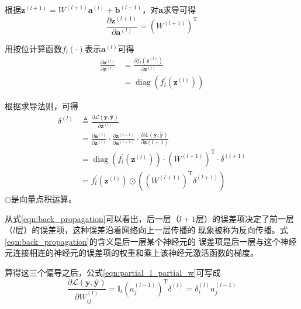 根据$\mathbf{z}^{(l+1)}=W^{(l+1)} \mathbf{a}^{(l)}+\mathbf{b}^{(l+1)}$，对$\mathbf{a}$求导可得
\begin{equation} 
\frac{\partial \mathbf{z}^{(l+1)}}{\partial \mathbf{a}^{(l)}}=\left(W^{(l+1)}\right)^{\mathrm{T}}
 \end{equation}

用按位计算函数$f_{l}(\cdot)$表示$\mathbf{a}^{(l)}$可得
\begin{equation} 
\begin{aligned} \frac{\partial \mathbf{a}^{(l)}}{\partial \mathbf{z}^{(l)}} &=\frac{\partial f_{l}\left(\mathbf{z}^{(l)}\right)}{\partial \mathbf{z}^{(l)}} \\ &=\operatorname{diag}\left(f_{l}^{\prime}\left(\mathbf{z}^{(l)}\right)\right) \end{aligned}
 \end{equation}

根据求导法则，可得
\begin{equation} 
\label{eqn:back_propagation}
\begin{aligned} \delta^{(l)} & \triangleq \frac{\partial \mathcal{L}(\mathbf{y}, \hat{\mathbf{y}})}{\partial \mathbf{z}^{(l)}} \\ 
&=\frac{\partial \mathbf{a}^{(l)}}{\partial \mathbf{z}^{(l)}} \cdot \frac{\partial \mathbf{z}^{(l+1)}}{\partial \mathbf{a}^{(l+1)}} \cdot \frac{\partial \mathcal{L}(\mathbf{y}, \hat{\mathbf{y}})}{\partial \mathbf{z}(l+1)} \\ 
&=\operatorname{diag}\left(f_{l}^{\prime}\left(\mathbf{z}^{(l)}\right)\right) \cdot\left(W^{(l+1)}\right)^{\mathrm{T}} \cdot \delta^{(l+1)} \\ &=f_{l}^{\prime}\left(\mathbf{z}^{(l)}\right) \odot\left(\left(W^{(l+1)}\right)^{\mathrm{T}} \delta^{(l+1)}\right) \end{aligned}
\end{equation}
$\odot$是向量点积运算。

从式\ref{eqn:back_propagation}可以看出，后一层（$l+1$层）的误差项决定了前一层（$l$层）的误差项，这种误差沿着网络向上一层传播的
现象被称为反向传播。式\ref{eqn:back_propagation}的含义是后一层某个神经元的
误差项是后一层与这个神经元连接相连的神经元的误差项的权重和乘上该神经元激活函数的梯度。

算得这三个偏导之后，公式\ref{eqn:partial_l_partial_w}可写成
\begin{equation} 
\frac{\partial \mathcal{L}(\mathbf{y}, \hat{\mathbf{y}})}{\partial W_{i j}^{(l)}}=\mathbb{I}_{i}\left(a_{j}^{(l-1)}\right)^{\mathrm{T}} \delta^{(l)}=\delta_{i}^{(l)} a_{j}^{(l-1)}
\end{equation}

